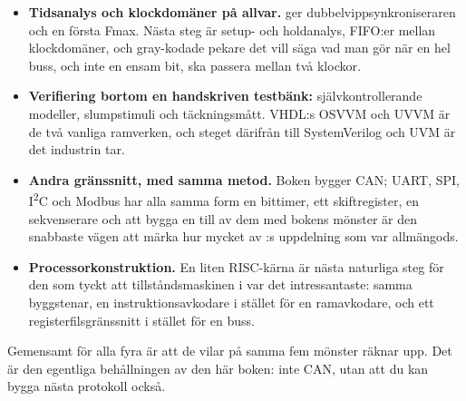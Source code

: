 \begin{itemize}
  \item \textbf{Tidsanalys och klockdomäner på allvar.}  ger dubbelvippsynkroniseraren
    och  en första Fmax. Nästa steg är setup- och holdanalys, FIFO:er mellan
    klockdomäner, och gray-kodade pekare \textemdash{} det vill säga vad man gör när en hel buss, och
    inte en ensam bit, ska passera mellan två klockor.
  \item \textbf{Verifiering bortom en handskriven testbänk:} självkontrollerande modeller,
    slumpstimuli och täckningsmått. VHDL:s OSVVM och UVVM är de två vanliga ramverken, och steget
    därifrån till SystemVerilog och UVM är det industrin tar.
  \item \textbf{Andra gränssnitt, med samma metod.} Boken bygger CAN; UART, SPI, I\textsuperscript{2}C
    och Modbus har alla samma form \textemdash{} en bittimer, ett skiftregister, en sekvenserare
    \textemdash{} och att bygga en till av dem med bokens mönster är den snabbaste vägen att märka
    hur mycket av :s uppdelning som var allmängods.
  \item \textbf{Processorkonstruktion.} En liten RISC-kärna är nästa naturliga steg för den som tyckt
    att tillståndsmaskinen i  var det intressantaste: samma byggstenar, en
    instruktionsavkodare i stället för en ramavkodare, och ett registerfilsgränssnitt i stället för
    en buss.
\end{itemize}

Gemensamt för alla fyra är att de vilar på samma fem mönster  räknar upp. Det är den
egentliga behållningen av den här boken: inte CAN, utan att du kan bygga nästa protokoll också.
